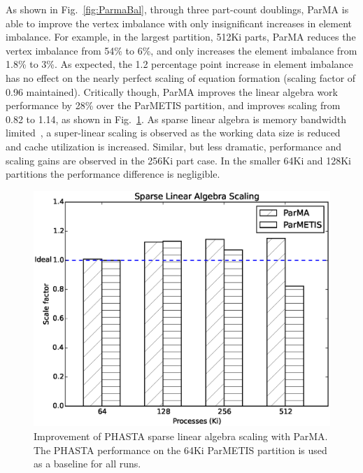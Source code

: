 As shown in Fig.~\ref{fig:ParmaBal}, through three part-count doublings, ParMA is
able to improve the vertex imbalance with only insignificant increases in element
imbalance.
For example, in the largest partition, 512Ki parts, ParMA reduces the vertex 
imbalance from 54\% to 6\%, and only increases the element imbalance from 
1.8\% to 3\%.
As expected, the 1.2 percentage point increase in element imbalance has no effect 
on the nearly perfect scaling of equation formation (scaling factor of 0.96
maintained).
Critically though, ParMA improves the linear algebra work performance by 28\% over the
ParMETIS partition, and improves scaling from 0.82 to 1.14, as shown in
Fig.~\ref{fig:eqSolveImprovement}.
As sparse linear algebra is memory bandwidth limited~\cite{zhou2010adjacency}, a
super-linear scaling is observed as the working data size is reduced and cache
utilization is increased.
Similar, but less dramatic, performance and scaling gains are observed in the
256Ki part case.
In the smaller 64Ki and 128Ki partitions the performance difference is
negligible.

\begin{figure} \centering
  \includegraphics[width=.8\textwidth]{results/phasta/1B/linAlgWorkScaling.eps}
  \caption{Improvement of PHASTA sparse linear algebra scaling with ParMA.
           The PHASTA performance on the 64Ki ParMETIS partition
           is used as a baseline for all runs.
  }
  \label{fig:eqSolveImprovement}
\end{figure}
